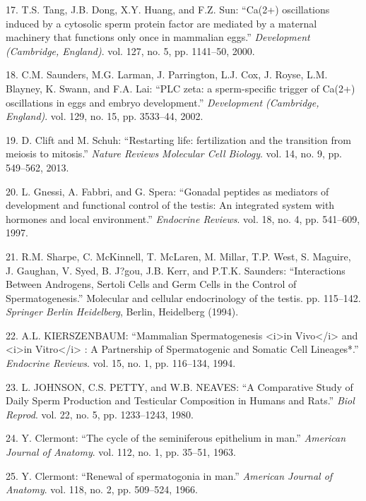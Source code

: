 \documentclass[12pt,a4paper,twoside]{ugathesis}
\theoremstyle{definition}
\theoremstyle{definition}
\theoremstyle{definition}
\theoremstyle{remark}
\begin{document}
\hypertarget{ref-Tang2000}{}
17. T.S. Tang, J.B. Dong, X.Y. Huang, and F.Z. Sun: ``Ca(2+)
oscillations induced by a cytosolic sperm protein factor are mediated by
a maternal machinery that functions only once in mammalian eggs.''
\emph{Development (Cambridge, England)}. vol. 127, no. 5, pp. 1141--50,
2000.

\hypertarget{ref-Saunders2002}{}
18. C.M. Saunders, M.G. Larman, J. Parrington, L.J. Cox, J. Royse, L.M.
Blayney, K. Swann, and F.A. Lai: ``PLC zeta: a sperm-specific trigger of
Ca(2+) oscillations in eggs and embryo development.'' \emph{Development
(Cambridge, England)}. vol. 129, no. 15, pp. 3533--44, 2002.

\hypertarget{ref-Clift2013}{}
19. D. Clift and M. Schuh: ``Restarting life: fertilization and the
transition from meiosis to mitosis.'' \emph{Nature Reviews Molecular
Cell Biology}. vol. 14, no. 9, pp. 549--562, 2013.

\hypertarget{ref-Gnessi1997}{}
20. L. Gnessi, A. Fabbri, and G. Spera: ``Gonadal peptides as mediators
of development and functional control of the testis: An integrated
system with hormones and local environment.'' \emph{Endocrine Reviews}.
vol. 18, no. 4, pp. 541--609, 1997.

\hypertarget{ref-Sharpe1994}{}
21. R.M. Sharpe, C. McKinnell, T. McLaren, M. Millar, T.P. West, S.
Maguire, J. Gaughan, V. Syed, B. J?gou, J.B. Kerr, and P.T.K. Saunders:
``Interactions Between Androgens, Sertoli Cells and Germ Cells in the
Control of Spermatogenesis.'' Molecular and cellular endocrinology of
the testis. pp. 115--142. \emph{Springer Berlin Heidelberg}, Berlin,
Heidelberg (1994).

\hypertarget{ref-KIERSZENBAUM1994}{}
22. A.L. KIERSZENBAUM: ``Mammalian Spermatogenesis
\textless{}i\textgreater{}in Vivo\textless{}/i\textgreater{} and
\textless{}i\textgreater{}in Vitro\textless{}/i\textgreater{} : A
Partnership of Spermatogenic and Somatic Cell Lineages*.''
\emph{Endocrine Reviews}. vol. 15, no. 1, pp. 116--134, 1994.

\hypertarget{ref-Johnson1980}{}
23. L. JOHNSON, C.S. PETTY, and W.B. NEAVES: ``A Comparative Study of
Daily Sperm Production and Testicular Composition in Humans and Rats.''
\emph{Biol Reprod}. vol. 22, no. 5, pp. 1233--1243, 1980.

\hypertarget{ref-Clermont1963}{}
24. Y. Clermont: ``The cycle of the seminiferous epithelium in man.''
\emph{American Journal of Anatomy}. vol. 112, no. 1, pp. 35--51, 1963.

\hypertarget{ref-Clermont1966}{}
25. Y. Clermont: ``Renewal of spermatogonia in man.'' \emph{American
Journal of Anatomy}. vol. 118, no. 2, pp. 509--524, 1966.
\end{document}
